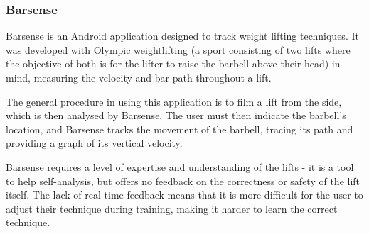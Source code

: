\subsubsection{Barsense}

Barsense\cite{barsense} is an Android application designed to track weight lifting techniques. It was developed with Olympic weightlifting (a sport consisting of two lifts where the objective of both is for the lifter to raise the barbell above their head) in mind, measuring the velocity and bar path throughout a lift.

The general procedure in using this application is to film a lift from the side, which is then analysed by Barsense. The user must then indicate the barbell's location, and Barsense tracks the movement of the barbell, tracing its path and providing a graph of its vertical velocity.

Barsense requires a level of expertise and understanding of the lifts - it is a tool to help self-analysis, but offers no feedback on the correctness or safety of the lift itself. The lack of real-time feedback means that it is more difficult for the user to adjust their technique during training, making it harder to learn the correct technique.